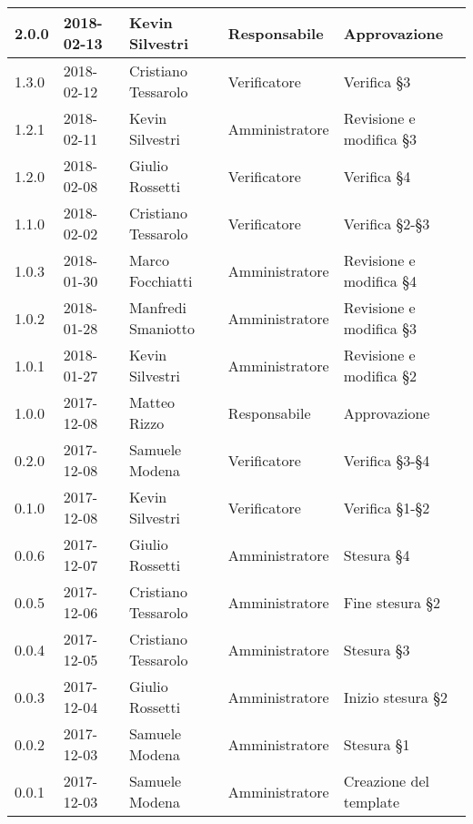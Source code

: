 \documentclass[./NormediProgetto.tex]{subfiles}
\begin{document}
\begin{longtable}{|p{20mm}|p{20mm}|p{40mm}|p{30mm}|p{50mm}|}
		2.0.0 & 2018-02-13 & Kevin Silvestri & Responsabile & Approvazione\\ \hline
		1.3.0 & 2018-02-12 & Cristiano Tessarolo & Verificatore &  Verifica §3\\ \hline
		1.2.1 & 2018-02-11 & Kevin Silvestri & Amministratore & Revisione e modifica §3\\ \hline
		1.2.0 & 2018-02-08 & Giulio Rossetti & Verificatore & Verifica §4\\ \hline  
		1.1.0 & 2018-02-02 & Cristiano Tessarolo & Verificatore & Verifica §2-§3\\ \hline 
		1.0.3 & 2018-01-30 & Marco Focchiatti & Amministratore & Revisione e modifica §4\\ \hline 
		1.0.2 & 2018-01-28 & Manfredi Smaniotto & Amministratore & Revisione e modifica §3\\ \hline 
		1.0.1 & 2018-01-27 & Kevin Silvestri & Amministratore & Revisione e modifica §2\\
		
		\hline
		
		1.0.0 & 2017-12-08 & Matteo Rizzo & Responsabile & Approvazione\\ \hline
		0.2.0 & 2017-12-08 & Samuele Modena & Verificatore & Verifica §3-§4\\ \hline
		0.1.0 & 2017-12-08 & Kevin Silvestri & Verificatore & Verifica §1-§2\\ \hline
		0.0.6 & 2017-12-07 & Giulio Rossetti & Amministratore & Stesura §4\\ \hline
		0.0.5 & 2017-12-06 & Cristiano Tessarolo & Amministratore & Fine stesura §2\\ \hline
		0.0.4 & 2017-12-05 & Cristiano Tessarolo & Amministratore & Stesura §3\\ \hline
		0.0.3 & 2017-12-04 & Giulio Rossetti & Amministratore & Inizio stesura §2\\ \hline
		0.0.2 & 2017-12-03 & Samuele Modena & Amministratore & Stesura §1\\ \hline
		0.0.1 & 2017-12-03 & Samuele Modena & Amministratore & Creazione del template\\ \hline
\end{longtable}
\end{document}
